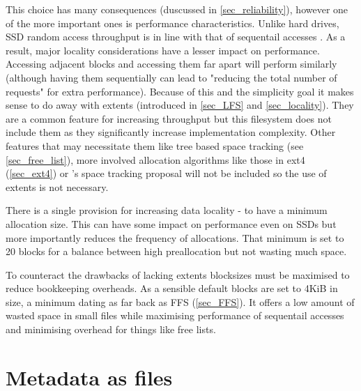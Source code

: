         This choice has many consequences (duscussed in \ref{sec_reliability}),
        however one of the more important ones is performance characteristics.
        Unlike hard drives, SSD random access throughput is in line with that
        of sequentail accesses \cite{servethehome_review}. As a result, major
        locality considerations have a lesser impact on performance. Accessing
        adjacent blocks and accessing them far apart will perform similarly
        (although having them sequentially can lead to "reducing the total
        number of requests" \cite{ext4_docs} for extra performance). Because of
        this and the simplicity goal it makes sense to do away with extents
        (introduced in \ref{sec_LFS} and \ref{sec_locality}). They are a common
        feature for increasing throughput but this filesystem does not include
        them as they significantly increase implementation complexity. Other
        features that may necessitate them like tree based space tracking (see
        \ref{sec_free_list}), more involved allocation algorithms like those in
        ext4 (\ref{sec_ext4}) or \citeauthor{ext4_space_maps}'s space tracking
        proposal will not be included so the use of extents is not necessary.

        There is a single provision for increasing data locality - to have a
        minimum allocation size. This can have some impact on performance even
        on SSDs but more importantly reduces the frequency of allocations. That
        minimum is set to 20 blocks for a balance between high preallocation
        but not wasting much space.

        To counteract the drawbacks of lacking extents blocksizes must be
        maximised to reduce bookkeeping overheads. As a sensible default blocks
        are set to 4KiB in size, a minimum dating as far back as FFS
        (\ref{sec_FFS}). It offers a low amount of wasted space in small files
        while maximising performance of sequentail accesses and minimising
        overhead for things like free lists.

    \section{Metadata as files}
        \label{sec_files}


